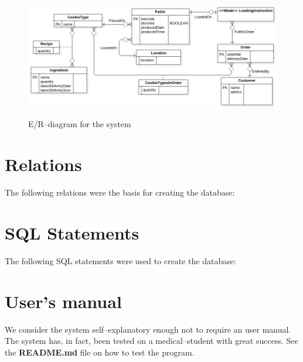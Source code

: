 \documentclass[a4paper]{scrartcl}
\numberwithin{equation}{section}
\begin{document}
\begin{figure}[h!]
  \begin{centering}
    \includegraphics[width=\textwidth]{../ER.png}
    \label{er-diagram}
    \caption{E/R--diagram for the system}
  \end{centering}
\end{figure}

\section*{Relations}
The following relations were the basis for creating the database:


\section*{SQL Statements}
The following SQL statements were used to create the database:


\section*{User's manual}
We consider the system self--explanatory enough not to require an user manual. 
The system has, in fact, been tested on a medical--student with great success. See the \textbf{README.md} file on how to test the program.
\end{document}
